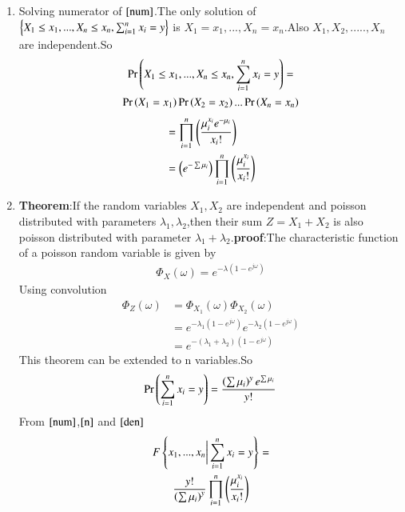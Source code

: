 \documentclass[journal,12pt,twocolumn]{IEEEtran}
\begin{document}
\begin{enumerate}
\item Solving numerator of $\eqref{num}$.The only solution of ${\left\{X_1\leq x_1,...,X_n\leq x_n,\sum_{i=1}^{n}x_i=y\right\}}$ is $X_1=x_1,...,X_n=x_n$.Also $X_1,X_2,.....,X_n$ are independent.So 
    \begin{multline}
        \Pr\left(X_1\leq x_1,...,X_n\leq x_n,\sum_{i=1}^{n}x_i=y\right)=\\
        \Pr\left(X_1=x_1\right)\Pr\left(X_2=x_2\right)...\Pr\left(X_n=x_n\right)
    \end{multline}
\begin{align}
    &=\prod_{i=1}^n\left(\frac{\mu_i^{x_i}e^{-\mu_i}}{x_i!}\right)\\
    &=\left(e^{-\sum\mu_i}\right)\prod_{i=1}^n\left(\frac{\mu_i^{x_i}}{x_i!}\right)\label{n}
\end{align}
\item \textbf{Theorem}:If the random variables $X_1,X_2$ are independent and poisson distributed with parameters $\lambda_1,\lambda_2$,then their sum $Z=X_1+X_2$ is also poisson distributed with parameter $\lambda_1+\lambda_2$.\textbf{proof}:The characteristic function of a poisson random variable is given by
\begin{align}
    \Phi_X(\omega)=e^{-\lambda(1-e^{j\omega})}
\end{align}
Using convolution 
\begin{align}
    \Phi_Z(\omega)&=\Phi_{X_1}(\omega)\Phi_{X_2}(\omega)\\
    &=e^{-\lambda_1(1-e^{j\omega})}e^{-\lambda_2(1-e^{j\omega})}\\
    &=e^{-(\lambda_1+\lambda_2)(1-e^{j\omega})}
\end{align}
This theorem can be extended to n variables.So
\begin{align}
    \Pr\left(\sum_{i=1}^{n}x_i=y\right)=\frac{\left(\sum\mu_i\right)^ye^{\sum\mu_i}}{y!}\label{den}
\end{align}
From $\eqref{num}$,$\eqref{n}$ and $\eqref{den}$ 
\begin{multline}
     F\left\{x_1,...,x_n\biggr\vert\sum_{i=1}^{n}x_i=y\right\}=\\
     \frac{y!}{\left(\sum\mu_i\right)^y}\prod_{i=1}^n\left(\frac{\mu_i^{x_i}}{x_i!}\right)
\end{multline}
\end{enumerate}
\end{document}
